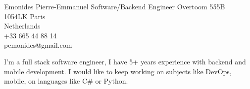 \documentclass{emonides-cv}
\begin{document}
  
  {Emonides} {Pierre-Emmanuel}
  {Software/Backend Engineer}
  { Overtoom 555B\\
    1054LK Paris\\
    Netherlands\\
    +33 665 44 88 14\\
    pemonides@gmail.com\\
    }

I'm a full stack software engineer, I have 5+ years experience with backend and mobile development.
I would like to keep working on subjects like DevOps, mobile, on languages like C\# or Python.
\end{document}
